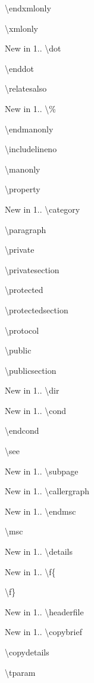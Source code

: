 \begin{DoxyDescription}
\item[]\textbackslash{}endxmlonly 
\item[]\textbackslash{}xmlonly 
\item[New in 1.\+3.\+4]\textbackslash{}dot 
\item[]\textbackslash{}enddot 
\item[]\textbackslash{}relatesalso 
\item[New in 1.\+3.\+7]\textbackslash{}\% 
\item[]\textbackslash{}endmanonly 
\item[]\textbackslash{}includelineno 
\item[]\textbackslash{}manonly 
\item[]\textbackslash{}property 
\item[New in 1.\+3.\+8]\textbackslash{}category 
\item[]\textbackslash{}paragraph 
\item[]\textbackslash{}private 
\item[]\textbackslash{}privatesection 
\item[]\textbackslash{}protected 
\item[]\textbackslash{}protectedsection 
\item[]\textbackslash{}protocol 
\item[]\textbackslash{}public 
\item[]\textbackslash{}publicsection 
\item[New in 1.\+3.\+9]\textbackslash{}dir 
\item[New in 1.\+4.\+0]\textbackslash{}cond 
\item[]\textbackslash{}endcond 
\item[]\textbackslash{}see 
\item[New in 1.\+4.\+2]\textbackslash{}subpage 
\item[New in 1.\+4.\+7]\textbackslash{}callergraph 
\item[New in 1.\+5.\+2]\textbackslash{}endmsc 
\item[]\textbackslash{}msc 
\item[New in 1.\+5.\+3]\textbackslash{}details 
\item[New in 1.\+5.\+4]\textbackslash{}f\{ 
\item[]\textbackslash{}f\} 
\item[New in 1.\+5.\+5]\textbackslash{}headerfile 
\item[New in 1.\+5.\+6]\textbackslash{}copybrief 
\item[]\textbackslash{}copydetails 
\item[]\textbackslash{}tparam 

\end{DoxyDescription}
